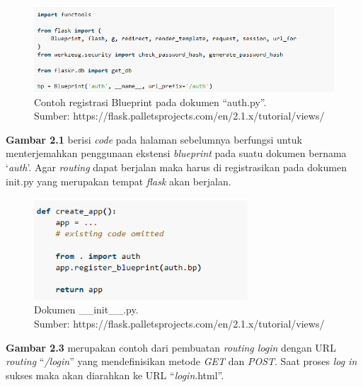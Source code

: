 \begin{figure}[H]
	\centering
	\includegraphics[width=12cm]{gambar/flask1.png}
	\caption{Contoh registrasi Blueprint pada dokumen “auth.py”. \\ Sumber: https://flask.palletsprojects.com/en/2.1.x/tutorial/views/}
	\label{Gambar:registrasi blueprint}
\end{figure}

\textbf{Gambar 2.1} berisi \emph{code} pada halaman sebelumnya berfungsi untuk menterjemahkan penggunaan ekstensi \emph{blueprint} pada suatu dokumen bernama ‘\emph{auth}’. Agar \emph{routing} dapat berjalan maka harus di registrasikan pada dokumen init.py yang merupakan tempat \emph{flask} akan berjalan.

\begin{figure}[H]
	\centering
	\includegraphics[width=8cm]{gambar/flask2.png}
	\caption{Dokumen \_\_init\_\_.py. \\ Sumber: https://flask.palletsprojects.com/en/2.1.x/tutorial/views/}
	\label{Gambar:registrasi blueprint}
\end{figure}

\textbf{Gambar 2.3} merupakan contoh dari pembuatan \emph{routing login} dengan URL \emph{routing} “\emph{/login}” yang mendefinisikan metode \emph{GET} dan \emph{POST}. Saat proses \emph{log in} sukses maka akan diarahkan ke URL “\emph{login}.html”.

